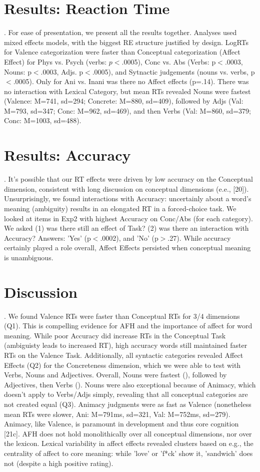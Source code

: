 \section{Results: Reaction Time}. For ease of presentation, we present all the results together. Analyses used mixed effects models, with the biggest RE structure justified by design.  LogRTs for Valence categorization were faster than Conceptual categorization (Affect Effect) for Phys vs. Psych (verbs: $p<$.0005), Conc vs. Abs (Verbs: p$<$.0003, Nouns: p$<$.0003, Adjs. p$<$.0005), and Sytnactic judgements (nouns vs. verbs, p$<$.0005). Only for Ani vs. Inani was there no Affect effects (p=.14). There was no interaction with Lexical Category, but mean RTs revealed Nouns were fastest (Valence: M=741, sd=294; Concrete: M=880, sd=409), followed by Adjs (Val: M=793, sd=347; Conc: M=962, sd=469), and then Verbs (Val: M=860, sd=379; Conc: M=1003, sd=488).

\section{Results: Accuracy}.
It's possible that our RT effects were driven by low accuracy on the Conceptual dimension, consistent with long discussion on conceptual dimensions (e.e., [20]). Unsurprisingly, we found interactions with Accuracy: uncertainly about a word's meaning (ambiguity) results in an elongated RT in a forced-choice task. We looked at items in Exp2 with highest Accuracy on Conc/Abs (for each category). We asked (1) was there still an effect of Task? (2) was there an interaction with Accuracy? Answers: 'Yes' (p$<$.0002), and 'No' (p$>$.27). While accuracy certainly played a role overall, Affect Effects persisted when conceptual meaning is unambiguous.


\section{Discussion}.
We found Valence RTs were faster than Conceptual RTs for 3/4 dimensions (Q1). This is compelling evidence for AFH and the importance of affect for word meaning. While poor Accuracy did increase RTs in the Conceptual Task (ambiguisty leads to increased RT), high accuracy words still maintained faster RTs on the Valence Task. Additionally, all syntactic categories revealed Affect Effects (Q2) for the Concreteness dimension, which we were able to test with Verbs, Nouns and Adjectives. Overall, Nouns were fastest (), followed by Adjectives, then Verbs (). Nouns were also exceptional because of Animacy, which doesn't apply to Verbs/Adjs simply, revealing that all conceptual categories are not created equal (Q3). Animacy judgments were as fast as Valence (nonetheless mean RTs were slower, Ani: M=791ms, sd=321, Val: M=752ms, sd=279). Animacy, like Valence, is paramount in development and thus core cognition [21c]. AFH does not hold monolithically over all conceptual dimensions, nor over the lexicon. Lexical variability in affect effects revealed clusters based on e.g., the centrality of affect to core meaning: while 'love' or 'f*ck' show it, 'sandwich' does not (despite a high positive rating).


